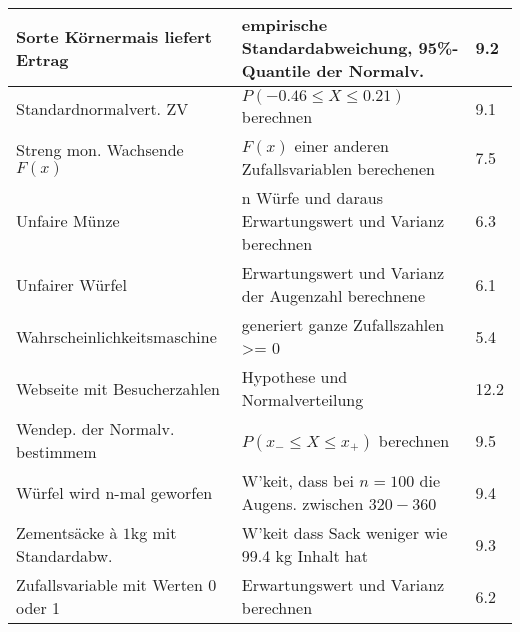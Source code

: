 \begin{center}
\begin{tabular}{|l|l|l|}
Sorte Körnermais liefert Ertrag & empirische Standardabweichung, 95\%-Quantile der Normalv. & 9.2 \\ \hline
Standardnormalvert. ZV& $P(-0.46 \leq X \leq 0.21)$ berechnen & 9.1 \\ \hline
Streng mon. Wachsende $F(x)$ & $F(x)$ einer anderen Zufallsvariablen berechenen & 7.5 \\ \hline
Unfaire Münze & n Würfe und daraus Erwartungswert und Varianz berechnen & 6.3 \\ \hline
Unfairer Würfel & Erwartungswert und Varianz der Augenzahl berechnene & 6.1 \\ \hline
Wahrscheinlichkeitsmaschine & generiert ganze Zufallszahlen >= 0 & 5.4 \\ \hline
Webseite mit Besucherzahlen & Hypothese und Normalverteilung & 12.2 \\ \hline
Wendep. der Normalv. bestimmem & $P(x_{-} \leq X \leq x_{+})$  berechnen & 9.5
\\ \hline Würfel wird n-mal geworfen & W'keit, dass bei $n=100$ die Augens. zwischen $320-360$ & 9.4 \\ \hline
Zementsäcke à $1$kg mit Standardabw. & W'keit dass Sack weniger wie 99.4 kg Inhalt hat & 9.3 \\ \hline
Zufallsvariable mit Werten 0 oder 1 & Erwartungswert und Varianz berechnen & 6.2 \\ \hline
\end{tabular}
\end{center}